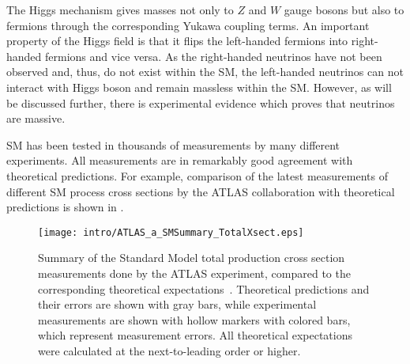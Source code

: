 The Higgs mechanism gives masses not only to $Z$ and $W$ gauge bosons but also to fermions through the corresponding Yukawa coupling terms. An important property of the Higgs field is that it flips the left-handed fermions into right-handed fermions and vice versa. 
As the right-handed neutrinos have not been observed and, thus, do not exist within the SM, the left-handed
neutrinos can not interact with Higgs boson and remain massless within the SM. 
However, as will be discussed further, there is experimental evidence which proves that neutrinos are massive.

SM has been tested in thousands of measurements by many different experiments.
All measurements are in remarkably good agreement with theoretical predictions.
For example, comparison of the latest measurements of different SM process cross sections by the ATLAS collaboration with theoretical predictions is shown in
.

\begin{figure}[]
  \centering
  \texttt{[image: intro/ATLAS\_a\_SMSummary\_TotalXsect.eps]}
  \caption{
  Summary of the Standard Model total production cross section measurements done by the ATLAS experiment, compared to the corresponding theoretical expectations~\cite{sm_atlas_public_plots_2016}. 
  Theoretical predictions and their errors are shown with gray bars, while experimental
  measurements are shown with hollow markers with colored bars, which represent measurement errors.
  All theoretical expectations were calculated at the next-to-leading order or higher. 
  }
  \label{fig:SM_theory_vs_data}
\end{figure}








